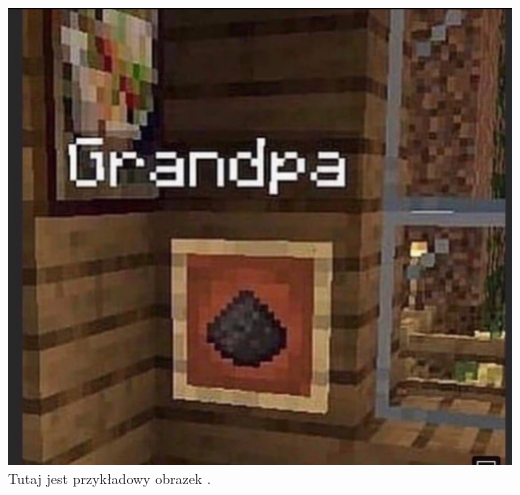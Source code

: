 \documentclass{article}
\begin{document}
\begin{center}
    \includegraphics[scale=0.3]{zdjecie.png}
    Tutaj jest przykładowy obrazek \cite{mem}.
\end{center}



\end{document}
